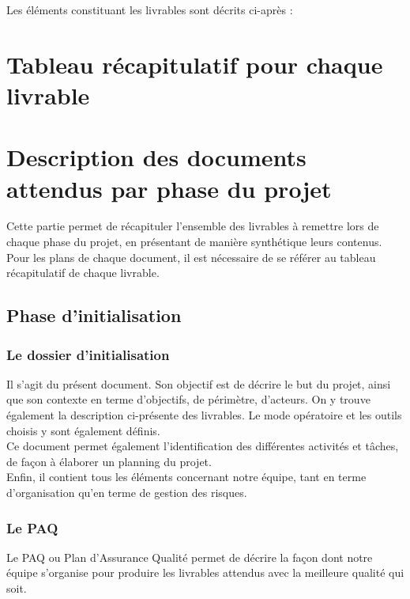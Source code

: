 Les éléments constituant les livrables sont décrits ci-après :

\section{Tableau récapitulatif pour chaque livrable}


\section{Description des documents attendus par phase du projet}

Cette partie permet de récapituler l’ensemble des livrables à remettre lors de chaque phase du projet, en présentant de manière synthétique leurs contenus. \\

Pour les plans de chaque document, il est nécessaire de se référer au tableau récapitulatif de chaque livrable.

\subsection{Phase d’initialisation}

\subsubsection{Le dossier d’initialisation}

Il s’agit du présent document. Son objectif est de décrire le but du projet, ainsi que son contexte en terme d’objectifs, de périmètre, d’acteurs. On y trouve également la description ci-présente des livrables. Le mode opératoire et les outils choisis y sont également définis.  \\

Ce document permet également l’identification des différentes activités et tâches, de façon à élaborer un planning du projet. \\

Enfin, il contient tous les éléments concernant notre équipe, tant en terme d’organisation qu’en terme de gestion des risques.

\subsubsection{Le PAQ}

Le PAQ ou Plan d’Assurance Qualité permet de décrire la façon dont notre équipe s’organise pour produire les livrables attendus avec la meilleure qualité qui soit. \\

